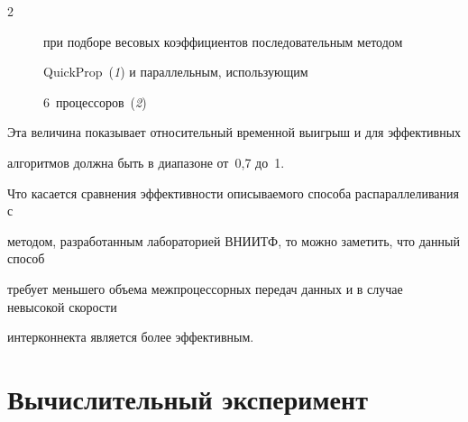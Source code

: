 \begin{multicols}{2}
\begin{figure}
\begin{minipage}[t]{81mm}
{при подборе весовых коэффициентов последовательным методом


QuickProp~(\textit{1}) и параллельным, использующим


6~процессоров~(\textit{2})


\label{f1kr}}


\end{minipage}


\hfill


\begin{minipage}[t]{81mm}




\vspace*{-15pt}




\end{minipage}


\vspace*{-2pt}


\end{figure}





 Эта величина показывает относительный временной выигрыш и для эффективных


алгоритмов должна быть в диапазоне от~0,7 до~1.





 Что касается сравнения эффективности описываемого способа распараллеливания с


методом, разработанным лабораторией ВНИИТФ, то можно заметить, что данный способ


требует меньшего объема межпроцессорных передач данных и в случае невысокой скорости


интерконнекта является более эффективным.





\vspace*{-5pt}





\section{Вычислительный эксперимент}






\end{multicols}

